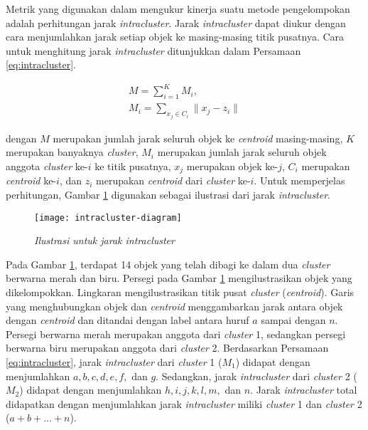 Metrik yang digunakan \cite{maulik2000genetic} dalam mengukur kinerja suatu metode pengelompokan adalah perhitungan jarak \textit{intracluster}. Jarak \textit{intracluster} dapat diukur dengan cara menjumlahkan jarak setiap objek ke masing-masing titik pusatnya. Cara untuk menghitung jarak \textit{intracluster} ditunjukkan dalam Persamaan \ref{eq:intracluster}.

\begin{equation}
\label{eq:intracluster}
	\begin{gathered}
	M=\sum_{i=1}^K M_i , \\
	M_i=\sum_{x_j\in C_i}\parallel x_j-z_i\parallel
	\end{gathered}
\end{equation}

dengan $M$ merupakan jumlah jarak seluruh objek ke \textit{centroid} masing-masing, $K$ merupakan banyaknya \textit{cluster}, $M_i$ merupakan jumlah jarak seluruh objek anggota \textit{cluster} ke-$i$ ke titik pusatnya, $x_j$ merupakan objek ke-$j$, $C_i$ merupakan \textit{centroid} ke-$i$, dan $z_i$ merupakan \textit{centroid} dari \textit{cluster} ke-$i$. Untuk memperjelas perhitungan, Gambar \ref{fig:intracluster} digunakan sebagai ilustrasi dari jarak \textit{intracluster}.

\begin{figure}[h]
	\begin{center}
		\texttt{[image: intracluster-diagram]}
		\caption{\textit{Ilustrasi untuk jarak \textit{intracluster}}}
		\label{fig:intracluster}
	\end{center}
\end{figure}

Pada Gambar \ref{fig:intracluster}, terdapat 14 objek yang telah dibagi ke dalam dua \textit{cluster} berwarna merah dan biru. Persegi pada Gambar \ref{fig:intracluster} mengilustrasikan objek yang dikelompokkan. Lingkaran mengilustrasikan titik pusat \textit{cluster} (\textit{centroid}). Garis yang menghubungkan objek dan \textit{centroid} menggambarkan jarak antara objek dengan \textit{centroid} dan ditandai dengan label antara huruf $a$ sampai dengan $n$. Persegi berwarna merah merupakan anggota dari \textit{cluster} 1, sedangkan persegi berwarna biru merupakan anggota dari \textit{cluster} 2. Berdasarkan Persamaan \ref{eq:intracluster}, jarak \textit{intracluster} dari \textit{cluster} 1 ($M_1$) didapat dengan menjumlahkan $a, b, c, d, e, f,$ dan $g$. Sedangkan, jarak \textit{intracluster} dari \textit{cluster} 2 ($M_2$) didapat dengan menjumlahkan $h, i, j, k, l, m,$ dan $n$. Jarak \textit{intracluster} total didapatkan dengan menjumlahkan jarak \textit{intracluster} miliki \textit{cluster} 1 dan \textit{cluster} 2 ($a + b + ... + n$).

